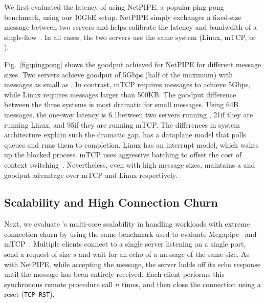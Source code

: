 We first evaluated the latency of \ix using NetPIPE, a popular
ping-pong benchmark, using our 10GbE setup.  NetPIPE simply exchanges
a fixed-size message between two servers and helps calibrate the
latency and bandwdith of a single-flow~\cite{snell1996netpipe}.  In
all cases, the two servers use the same system (Linux, mTCP, or \ix).


Fig.~\ref{fig:pingpong} shows the goodput achieved for NetPIPE for
different message sizes.  Two \ix servers achieve goodput of 5Gbps
(half of the maximum) with messages as small as . In
contrast, mTCP requires  messages to achieve 5Gbps, while
Linux requires messages larger than 500KB. The goodput difference
between the three systems is most dramatic for small messages. Using
64B messages, the one-way latency is 6.1\microsecond between two
servers running \ix, 21\microsecond if they are running Linux, and
95\microsecond if they are running mTCP.  The differences in system
architecture explain such the dramatic gap. \ix has a dataplane model
that polls queues and runs them to completion. Linux has an interrupt
model, which wakes up the blocked process. mTCP uses aggressive
batching to offset the cost of context switching~\cite{jeong2014mtcp}.
Nevertheless, even with high message sizes, \ix maintains a 
and  goodput advantage over mTCP and Linux respectively.

\subsection{Scalability and High Connection Churn}
\label{sec:eval:short}



Next, we evaluate \ix's multi-core scalability in handling workloads
with extreme connection churn by using the same benchmark used to
evaluate Megapipe~\cite{han2012megapipe} and
mTCP~\cite{jeong2014mtcp}. Multiple clients connect to a single server
listening on a single port, send a request of size $s$ and wait for an
echo of a message of the same size.  As with NetPIPE, while accepting
the message, the server holds off its echo response until the message
has been entirely received.  Each client performs this synchronous
remote procedure call $n$ times, and then close the connection using a
reset (\texttt{TCP RST}).


